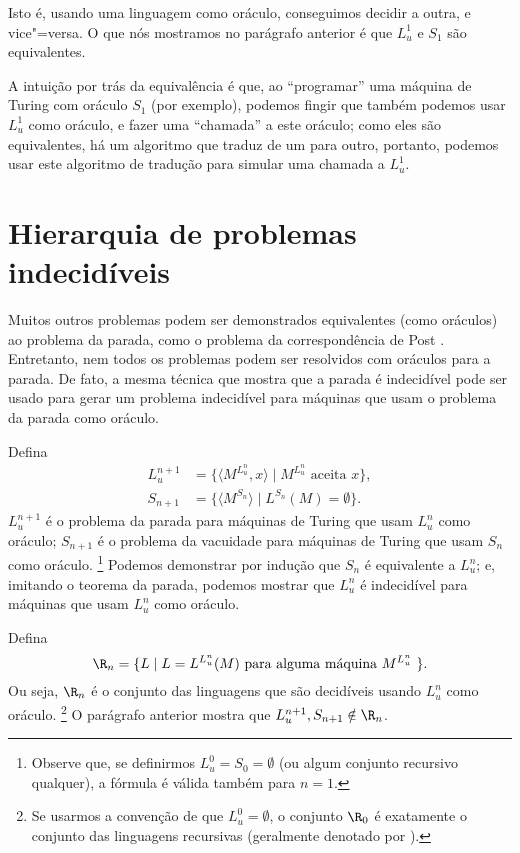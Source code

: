 Isto é, usando uma linguagem como oráculo, conseguimos decidir a outra,
e vice"=versa.
O que nós mostramos no parágrafo anterior é que
$L_u^1$ e $S_1$ são equivalentes.

A intuição por trás da equivalência é que,
ao ``programar'' uma máquina de Turing com oráculo $S_1$ (por exemplo),
podemos fingir que também podemos usar $L_u^1$ como oráculo,
e fazer uma ``chamada'' a este oráculo;
como eles são equivalentes,
há um algoritmo que traduz de um para outro,
portanto, podemos usar este algoritmo de tradução
para simular uma chamada a $L_u^1$.

\section{Hierarquia de problemas indecidíveis}

Muitos outros problemas podem ser demonstrados equivalentes
(como oráculos)
ao problema da parada,
como o problema da correspondência de Post \cite[p.~214]{HopcroftUllman1979}.
Entretanto,
nem todos os problemas podem ser resolvidos com oráculos para a parada.
De fato, a mesma técnica que mostra que a parada é indecidível
pode ser usado para gerar um problema indecidível
para máquinas que usam o problema da parada como oráculo.

Defina
\begin{align*}
    L_u^{n+1} &= \{ \langle M^{L_u^n}, x \rangle \mid M^{L_u^n} \text{ aceita } x \}, \\
    S_{n+1} &= \{ \langle M^{S_n} \rangle \mid L^{S_n}(M) = \emptyset \}.
\end{align*}
$L_u^{n+1}$ é o problema da parada
para máquinas de Turing que usam $L_u^n$ como oráculo;
$S_{n+1}$ é o problema da vacuidade
para máquinas de Turing que usam $S_n$ como oráculo.%
\footnote{
    Observe que,
    se definirmos $L_u^0 = S_0 = \emptyset$
    (ou algum conjunto recursivo qualquer),
    a fórmula é válida também para $n = 1$.
}
Podemos demonstrar por indução que $S_n$ é equivalente a $L_u^n$;
e, imitando o teorema da parada,
podemos mostrar que $L_u^n$ é indecidível para máquinas que usam $L_u^n$ como oráculo.

Defina
\begin{equation*}
    \R_n = \{ L \mid L = L^{L_u^n}(M) \text{ para alguma máquina $M^{L_u^n}$ } \}.
\end{equation*}
Ou seja, $\R_n$ é o conjunto das linguagens
que são decidíveis usando $L_u^n$ como oráculo.%
\footnote{
    Se usarmos a convenção de que $L_u^0 = \emptyset$,
    o conjunto $\R_0$ é exatamente o conjunto das linguagens recursivas
    (geralmente denotado por \R).
}
O parágrafo anterior mostra que $L_u^{n+1}, S_{n+1} \notin \R_n$.

